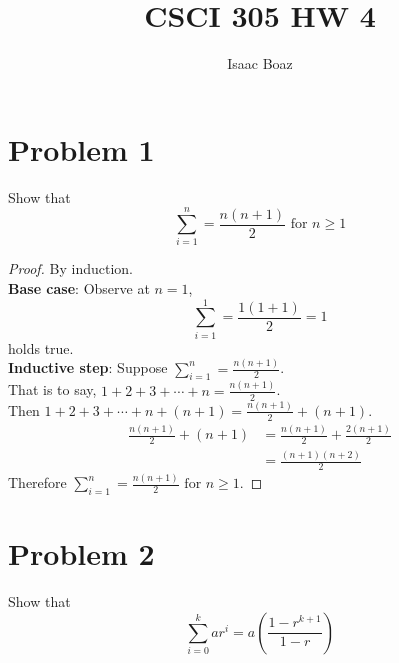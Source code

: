 \documentclass{article}
\title{CSCI 305 HW 4}
\author{Isaac Boaz}
\begin{document}
\maketitle

\section*{Problem 1}
Show that \[\sum_{i=1}^{n} = \frac{n(n+1)}{2} \text{ for } n \geq 1\]

\begin{proof}
    By induction. \\
    \textbf{Base case}: Observe at \(n = 1\),
    \begin{equation*}
        \sum_{i=1}^{1} = \frac{1(1+1)}{2} = 1
    \end{equation*} holds true. \\
    \textbf{Inductive step}: Suppose \(\sum_{i=1}^{n} = \frac{n(n+1)}{2}\). \\
    That is to say, \(1 + 2 + 3 + \cdots + n = \frac{n(n+1)}{2}\). \\
    Then \(1 + 2 + 3 + \cdots + n + (n + 1) = \frac{n(n+1)}{2} + (n+1)\). \\
    \begin{align*}
        \frac{n(n+1)}{2} + (n+1) & = \frac{n(n+1)}{2} + \frac{2(n+1)}{2} \\
                                 & = \frac{(n+1)(n+2)}{2}
    \end{align*}
    Therefore \(\sum_{i=1}^{n} = \frac{n(n+1)}{2} \text{ for } n \geq 1\).
\end{proof}

\pagebreak

\section*{Problem 2}
Show that \[\sum_{i=0}^{k}{ar^i} = a \left( \frac{1-r^{k+1}}{1-r} \right)\]
\end{document}
